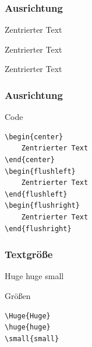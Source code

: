 \begin{frame}
  \frametitle{Ausrichtung}

  \begin{example}
    \begin{center}
      Zentrierter Text
    \end{center}
    \pause
    \begin{flushleft}
      Zentrierter Text
    \end{flushleft}
    \pause
    \begin{flushright}
      Zentrierter Text
    \end{flushright}
  \end{example}
\end{frame}
\begin{frame}[fragile]
	\frametitle{Ausrichtung}

	\begin{block}{Code}
		\begin{verbatim}
\begin{center}
	Zentrierter Text
\end{center}
\begin{flushleft}
	Zentrierter Text
\end{flushleft}
\begin{flushright}
	Zentrierter Text
\end{flushright}
		\end{verbatim}
	\end{block}
\end{frame}

\begin{frame}[fragile]
	\frametitle{Textgröße}

  \begin{example}
    \Huge{Huge}
    \huge{huge}
    \small{small}
  \end{example}

	\begin{block}{Größen}
		\begin{verbatim}
\Huge{Huge}
\huge{huge}
\small{small}
		\end{verbatim}
	\end{block}
\end{frame}


